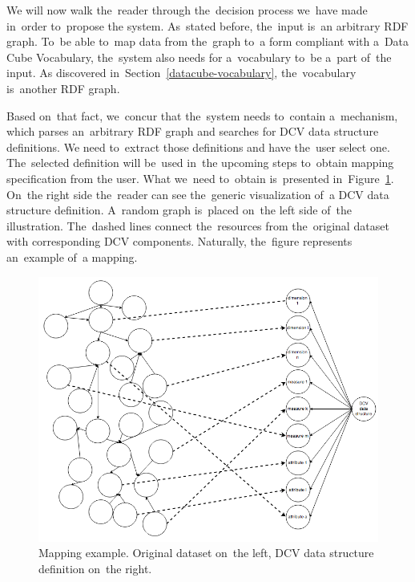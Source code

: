 We will now walk the~reader through the~decision process we~have made in~order to~propose 
the system. As~stated before, the~input is~an arbitrary RDF graph. To~be able to~map data from the~graph to~a form compliant with a~Data 
Cube Vocabulary, the~system also needs for a~vocabulary to~be a~part of~the input. 
As discovered in~Section~\ref{datacube-vocabulary}, the~vocabulary is~another 
RDF graph.

Based on~that fact, we~concur that the~system needs to~contain a~mechanism, which 
parses an~arbitrary RDF graph and searches for DCV data structure definitions. 
We need to~extract those definitions and have the~user select one. The~selected 
definition will be~used in~the upcoming steps to~obtain mapping specification from 
the user. What we~need to~obtain is~presented in~Figure~\ref{fig:mapping-example}. On~the right side the~reader can see the~generic visualization of~a DCV data structure definition. A~random graph is~placed on~the left side of~the illustration. The~dashed lines connect the~resources 
from the~original dataset with corresponding DCV components. Naturally, the~figure represents an~example of~a mapping.

\begin{figure}
	\centering
	\includegraphics[width=140mm]{img/mapping-example.png}
	\caption{Mapping example. Original dataset on~the left, DCV data structure definition on~the right.}
	\label{fig:mapping-example}
\end{figure}

